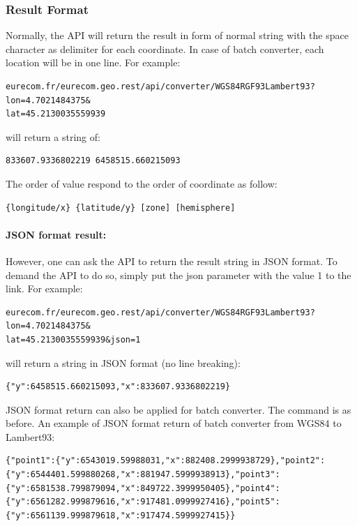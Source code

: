 \subsubsection{Result Format}
Normally, the API will return the result in form of normal string with the space character as delimiter for each coordinate. In case of batch converter, each location will be in one line. For example:
\begin{verbatim}
eurecom.fr/eurecom.geo.rest/api/converter/WGS84RGF93Lambert93?lon=4.7021484375&
lat=45.2130035559939
\end{verbatim}

will return a string of:
\begin{verbatim}
833607.9336802219 6458515.660215093
\end{verbatim}

The order of value respond to the order of coordinate as follow:
\begin{verbatim}
{longitude/x} {latitude/y} [zone] [hemisphere]
\end{verbatim}

\paragraph{JSON format result:}
However, one can ask the API to return the result string in JSON format. To demand the API to do so, simply put the json parameter with the value 1 to the link. For example:
\begin{verbatim}
eurecom.fr/eurecom.geo.rest/api/converter/WGS84RGF93Lambert93?lon=4.7021484375&
lat=45.2130035559939&json=1
\end{verbatim}

will return a string in JSON format (no line breaking):
\begin{verbatim}
{"y":6458515.660215093,"x":833607.9336802219}
\end{verbatim}

JSON format return can also be applied for batch converter. The command is as before. An example of JSON format return of batch converter from WGS84 to Lambert93:

\begin{lstlisting}
{"point1":{"y":6543019.59988031,"x":882408.2999938729},"point2":{"y":6544401.599880268,"x":881947.5999938913},"point3":{"y":6581538.799879094,"x":849722.3999950405},"point4":{"y":6561282.999879616,"x":917481.0999927416},"point5":{"y":6561139.999879618,"x":917474.5999927415}}
\end{lstlisting}

